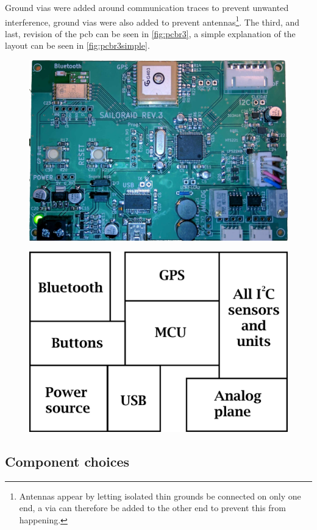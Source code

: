 Ground \gls{via}s were added around communication traces to prevent unwanted interference, ground \gls{via}s were also added to prevent antennas\footnote{Antennas appear by letting isolated thin grounds be connected on only one end, a \gls{via} can therefore be added to the other end to prevent this from happening.}.
The third, and last, revision of the \gls{pcb} can be seen in \autoref{fig:pcbr3}, a simple explanation of the layout can be seen in \autoref{fig:pcbr3simple}.
\begin{figure}[H]
	\centering
    	\includegraphics[width=.8\linewidth]{Figures/pcb_rev3.jpg}
	\label{fig:pcbr3}
\end{figure}
\begin{figure}[H]
	\centering
   	\includegraphics[width=.6\linewidth]{Figures/pcb_rev3_simple.png}
	\label{fig:pcbr3simple}
\end{figure}

\subsection{Component choices}\label{sec:hw:tip1}


